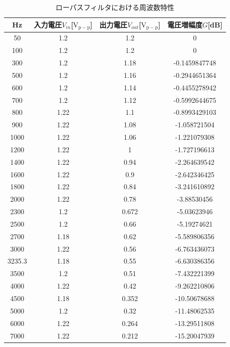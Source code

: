 \documentclass[a4paper,11pt,uplatex]{jsarticle}
\begin{document}
\begin{table}[H]
	\caption{ローパスフィルタにおける周波数特性}
	\label{ローパス特性}
	\begin{center}
    \begin{tabular}[H]{|c|c|c|c|}\hline
      Hz & 入力電圧$V_{in}$[$\mathrm{V_{p-p}}$] & 出力電圧$V_{out}$[$\mathrm{V_{p-p}}$] & 電圧増幅度$G$[dB]  \\ \hline
      50 & 1.2 & 1.2 & 0 \\ \hline
      100 & 1.2 & 1.2 & 0 \\ \hline
      300 & 1.2 & 1.18 & -0.1459847748 \\ \hline
      500 & 1.2 & 1.16 & -0.2944651364 \\ \hline
      600 & 1.2 & 1.14 & -0.4455278942 \\ \hline
      700 & 1.2 & 1.12 & -0.5992644675 \\ \hline
      800 & 1.22 & 1.1 & -0.8993429103 \\ \hline
      900 & 1.22 & 1.08 & -1.058721504 \\ \hline
      1000 & 1.22 & 1.06 & -1.221079308 \\ \hline
      1200 & 1.22 & 1 & -1.727196613 \\ \hline
      1400 & 1.22 & 0.94 & -2.264639542 \\ \hline
      1600 & 1.22 & 0.9 & -2.642346425 \\ \hline
      1800 & 1.22 & 0.84 & -3.241610892 \\ \hline
      2000 & 1.22 & 0.78 & -3.88530456 \\ \hline
      2300 & 1.2 & 0.672 & -5.03623946 \\ \hline
      2500 & 1.2 & 0.66 & -5.19274621 \\ \hline
      2700 & 1.18 & 0.62 & -5.589806356 \\ \hline
      3000 & 1.22 & 0.56 & -6.763436073 \\ \hline
      3235.3 & 1.18 & 0.55 & -6.630386356 \\ \hline
      3500 & 1.2 & 0.51 & -7.432221399 \\ \hline
      4000 & 1.22 & 0.42 & -9.262210806 \\ \hline
      4500 & 1.18 & 0.352 & -10.50678688 \\ \hline
      5000 & 1.2 & 0.32 & -11.48062535 \\ \hline
      6000 & 1.22 & 0.264 & -13.29511808 \\ \hline
      7000 & 1.22 & 0.212 & -15.20047939 \\ \hline

\end{tabular}
\end{center}
\end{table}
\end{document}
